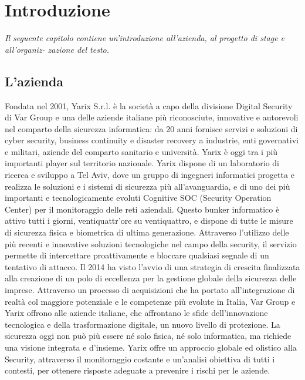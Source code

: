 
\chapter{Introduzione}
\label{cap:introduzione}

\textit{Il seguente capitolo contiene un’introduzione all’azienda, al progetto di stage e all’organiz-
zazione del testo.}\newline{}

\section{L'azienda}

Fondata nel 2001, Yarix S.r.l. è la società a capo della divisione Digital Security di Var Group e una delle aziende italiane più riconosciute, innovative e autorevoli nel comparto della sicurezza informatica: da 20 anni fornisce servizi e soluzioni di cyber security, business continuity e disaster recovery a industrie, enti governativi e militari, aziende del comparto sanitario e università. Yarix è oggi tra i più importanti player sul territorio nazionale.\newline{}
Yarix dispone di un laboratorio di ricerca e sviluppo a Tel Aviv, dove un gruppo di ingegneri informatici progetta e realizza le soluzioni e i sistemi di sicurezza più all’avanguardia, e di uno dei più importanti e tecnologicamente evoluti Cognitive SOC (Security Operation Center) per il monitoraggio delle reti aziendali. Questo bunker informatico è attivo tutti i giorni, ventiquattr’ore su ventiquattro, e dispone di tutte le misure di sicurezza fisica e biometrica di ultima generazione. Attraverso l’utilizzo delle più recenti e innovative soluzioni tecnologiche nel campo della security, il servizio permette di intercettare proattivamente e bloccare qualsiasi segnale di un tentativo di attacco.\newline{}
Il 2014 ha visto l’avvio di una strategia di crescita finalizzata alla creazione di un polo di eccellenza per la gestione globale della sicurezza delle imprese. Attraverso un processo di acquisizioni che ha portato all’integrazione di realtà col maggiore potenziale e le competenze più evolute in Italia, Var Group e Yarix offrono alle aziende italiane, che affrontano le sfide dell’innovazione tecnologica e della trasformazione digitale, un nuovo livello di protezione. La sicurezza oggi non può più essere né solo fisica, né solo informatica, ma richiede una visione integrata e d’insieme. Yarix offre un approccio globale ed olistico alla Security, attraverso il monitoraggio costante e un’analisi obiettiva di tutti i contesti, per ottenere risposte adeguate a prevenire i rischi per le aziende.

